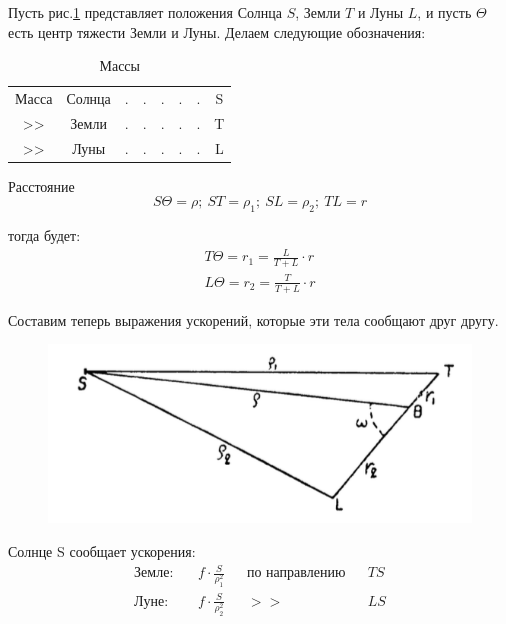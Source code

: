 \documentclass[a4paper,12pt]{article}
\begin{document}
Пусть рис.\ref{fig:21} представляет положения Солнца $S$, Земли $T$ и Луны $L$, и пусть $\Theta$ есть центр тяжести Земли и Луны. Делаем следующие обозначения:
\begin{table}[!h]
  \begin{center}
    \begin{tabular}{cccccccc}
      Масса & Солнца & . & . & . & . & . & S \\
      >> & Земли & . & . & . & . & . & T \\
      >> & Луны & . & . & . & . & . & L
    \end{tabular}
  \end{center}
  \caption{Массы}\label{tbl:masses}
\end{table}

Расстояние
\[ S\Theta = \rho; \: ST = \rho_1; \: SL = \rho_2; \: TL = r \]

тогда будет:
\begin{equation}
	\begin{aligned}
		T\Theta = r_1 = \frac{L}{T+L} \cdot r \\
		L\Theta = r_2 = \frac{T}{T+L} \cdot r
	\end{aligned}
\end{equation}

Составим теперь выражения ускорений, которые эти тела сообщают друг другу.

\begin{figure}
  \includegraphics[width=0.9\linewidth,keepaspectratio]{21.png}
  \caption{}\label{fig:21}
\end{figure}

Солнце S сообщает ускорения:
\begin{equation*}
	\begin{aligned}
      Земле: && f \cdot \frac{S}{\rho_1 ^2} && \text{по направлению} && TS \\
      Луне: && f \cdot \frac{S}{\rho_2 ^2} && >> && LS
  \end{aligned}
\end{equation*}
\end{document}
